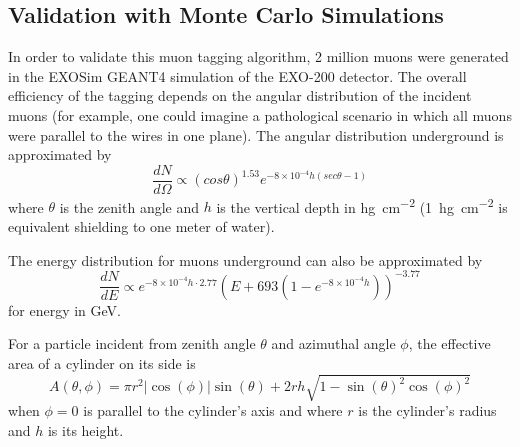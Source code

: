 \documentclass[herrin-thesis.tex]{subfiles}
\begin{document}
\subsection{Validation with Monte Carlo Simulations}
In order to validate this muon tagging algorithm, 2 million muons were generated in the EXOSim GEANT4 simulation of the EXO-200 detector. The overall efficiency of the tagging depends on the angular distribution of the incident muons (for example, one could imagine a pathological scenario in which all muons were parallel to the wires in one plane). The angular distribution underground is approximated\cite{miyake:1973} by
\begin{equation}
\label{eq:muon_angular_distribution}
\frac{dN}{d\Omega} \propto \left (cos \theta \right)^{1.53}e^{-8\times10^{-4} h \left(sec \theta -1\right)}
\end{equation}
where \(\theta\) is the zenith angle and \(h\) is the vertical depth in \si{\hecto\gram\per\square\centi\meter} (\SI{1}{\hecto\gram\per\square\centi\meter} is equivalent shielding to one meter of water).

The energy distribution for muons underground can also be approximated\cite{Mei:2006qy} by
\begin{equation}
\label{eq:muon_energy_distribution}
\frac{dN}{dE} \propto e^{-8\times10^{-4} h\cdot 2.77}\left(E+693\left(1-e^{-8\times10^{-4} h}\right)\right)^{-3.77}
\end{equation}
for energy in \si{\GeV}.

For a particle incident from zenith angle \(\theta\) and azimuthal angle \(\phi\), the effective area of a cylinder on its side is
\begin{equation}
A(\theta,\phi) = \pi r^2 |\cos(\phi)|\sin(\theta) + 2 r h \sqrt{1-\sin(\theta)^2 \cos(\phi)^2}
\end{equation}
when \(\phi=0\) is parallel to the cylinder's axis and where \(r\) is the cylinder's radius and \(h\) is its height.
\end{document}
